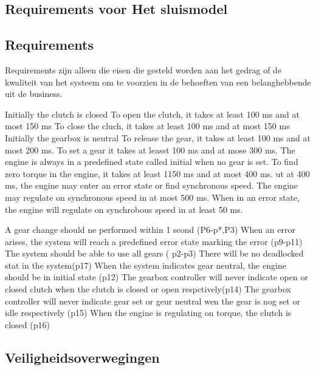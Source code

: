 \subsection{Requirements voor Het sluismodel}

 
\subsection{Requirements}
Requirements zijn alleen die eisen die gesteld worden aan het gedrag of de kwaliteit van het systeem om te voorzien in de behoeften van een belanghebbende uit de business.



Initially the clutch is closed
To open the clutch, it takes at least 100 ms and at most 150 ms
To close the cluch, it takes at least 100 ms and at most 150 ms
Initially the gearbox is neutral
To release the gear, it takes at least 100 ms and at most 200 ms.
To set a gear it takes at leasst 100 ms and at mose 300 ms.
The engine is always in a predefined state called initial when no gear is set.
To find zero torque in the engine, it takes at least 1150 ms and at most 400 ms. ut at 400 ms, the engine may enter an error state or find synchronous speed.
The  engine may regulate on synchronous speed in at most 500 ms.
When in an error state, the engine will regulate on synchrobous speed in at least 50 ms.


A gear change should ne performed within 1 seond (P6-p*,P3)
When an error arises, the system will reach a predefined error state marking the error (p9-p11)
The system should be able to use all gears ( p2-p3)
There will be no deadlocked stat in the system(p17)
When the system indicates gear neutral, the engine should  be in initial state (p12)
The gearbox controller will never indicate open or closed clutch when the clutch is closed or open respctively(p14)
The gearbox controller will never indicate gear set or geur neutral wen the gear is nog set or idle respectively (p15)
When the engine is regulating on torque, the clutch is closed (p16)


 

	\subsection{Veiligheidsoverwegingen}


